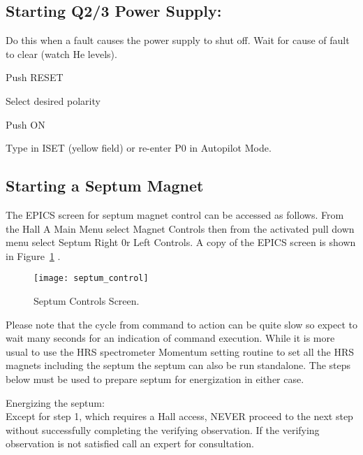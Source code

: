 {\subsection{Starting Q2/3 Power Supply:}

 Do this when a fault causes the power supply to shut off.
 Wait for cause of fault to clear (watch He levels). 
 \begin{list}{.~}{\setlength{\itemsep}{-0.15cm}}
   \item Push RESET 
   \item Select desired polarity
   \item Push ON
   \item Type in ISET (yellow field) or re-enter P0 in Autopilot Mode.
\end{list}

\subsection{Starting a Septum Magnet}
\label{sec:septum-start}

The EPICS screen for septum magnet control can be accessed as follows. From the Hall A Main Menu select
 Magnet Controls then from the activated pull down menu select Septum Right 0r Left Controls. A copy of
 the EPICS screen is shown in Figure~\ref{fig:septum_cntrl} .

\begin{figure}
\begin{center}
\texttt{[image: septum\_control]}
{\linespread{1.}
\caption[Spectrometers:Septum Controls Screen]{Septum Controls Screen.}
\label{fig:septum_cntrl}}
\end{center}
\end{figure}
 
Please note that the cycle from command to action can be quite slow so
expect to wait many seconds for an indication of command
execution. While it is more usual to use the HRS spectrometer Momentum
setting routine to set all the HRS magnets including the septum the
septum can also be run standalone. The steps below must be used to
prepare septum for energization in either case.

\noindent Energizing the septum:\\

 Except for step 1, which requires a Hall access,
NEVER proceed to the next step without successfully completing the
verifying observation. If the verifying observation is not satisfied
call an expert for consultation.

}
